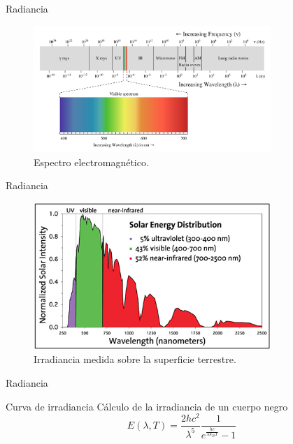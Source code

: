\documentclass[handout]{beamer}
\begin{document}
\begin{frame}{Radiancia}
  \begin{figure}
  \centering
  \includegraphics[width=0.8\textwidth]{imagenes/espectrum.png}
  \caption{Espectro electromagn\'etico.}
  \end{figure}
\end{frame}

\begin{frame}{Radiancia}
  \begin{figure}
  \centering
  \includegraphics[width=0.8\textwidth]{imagenes/blackpercent.png}
  \caption{Irradiancia medida sobre la superficie terrestre.}
  \end{figure}
\end{frame}

\begin{frame}{Radiancia}
  \begin{block}{Curva de irradiancia}
    C\'alculo de la irradiancia de un cuerpo negro
    $$ E(\lambda,T) = \frac{2hc^2}{\lambda^5}\frac{1}{e^{\frac{hc}{\lambda k_B T}}-1}$$
  \end{block}
\end{frame}
\end{document}

